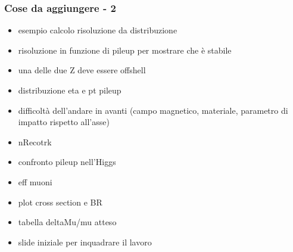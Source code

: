 \documentclass{beamer}
\begin{document}
\begin{frame}
\frametitle{Cose da aggiungere - 2}
\begin{itemize}
\item esempio calcolo risoluzione da distribuzione
\item risoluzione in funzione di pileup per mostrare che \`e stabile
\item una delle due Z deve essere offshell
\item distribuzione eta e pt pileup
\item difficolt\`a dell'andare in avanti (campo magnetico, materiale, parametro di impatto rispetto all'asse)
\item nRecotrk
\item confronto pileup nell'Higgs
\item eff muoni
\item plot cross section e BR
\item tabella deltaMu/mu atteso
\item slide iniziale per inquadrare il lavoro
\end{itemize}
\end{frame}
\end{document}
